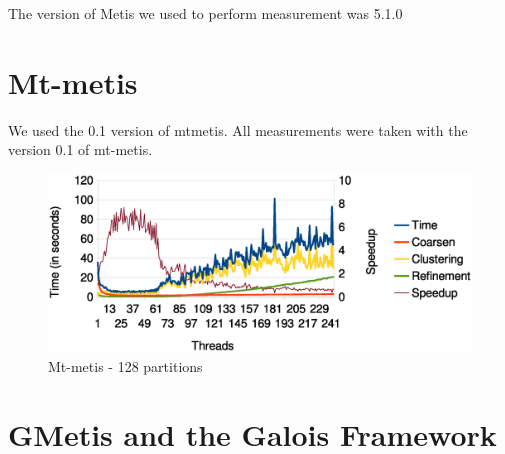 \documentclass[abstract=on,9pt,twocolumn]{scrartcl}
\begin{document}
The version of Metis we used to perform measurement was 5.1.0


\section{Mt-metis}
\label{sec:mt-metis}

We used the 0.1 version of mtmetis.
All measurements were taken with the version 0.1 of mt-metis.

\begin{center}
\begin{figure}[htb]
    \includegraphics[width=\columnwidth]{img/mtmetis128.eps}
    \caption{Mt-metis - 128 partitions}
    \label{img:mtmetis128}
\end{figure}
\end{center}



\section{GMetis and the Galois Framework} %
\end{document}
